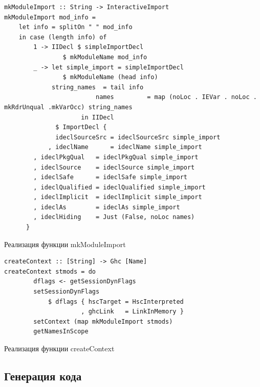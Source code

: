 		\begin{ListingEnv}[h]
		\begin{lstlisting}
mkModuleImport :: String -> InteractiveImport
mkModuleImport mod_info = 
	let info = splitOn " " mod_info
 	in case (length info) of
		1 -> IIDecl $ simpleImportDecl 
			    $ mkModuleName mod_info
		_ -> let simple_import = simpleImportDecl 
			    $ mkModuleName (head info)
			 string_names  = tail info
                         names         = map (noLoc . IEVar . noLoc . mkRdrUnqual .mkVarOcc) string_names
                     in IIDecl 
              $ ImportDecl { 
              ideclSourceSrc = ideclSourceSrc simple_import
            , ideclName      = ideclName simple_import
	    , ideclPkgQual   = ideclPkgQual simple_import
	    , ideclSource    = ideclSource simple_import
	    , ideclSafe      = ideclSafe simple_import
	    , ideclQualified = ideclQualified simple_import
	    , ideclImplicit  = ideclImplicit simple_import
	    , ideclAs        = ideclAs simple_import
	    , ideclHiding    = Just (False, noLoc names) 
	  }
		\end{lstlisting}
		\caption{Реализация функции mkModuleImport} \label{mkmod}
		\end{ListingEnv}
	
		\begin{ListingEnv}[h]
		\begin{lstlisting}
createContext :: [String] -> Ghc [Name]
createContext stmods = do
		dflags <- getSessionDynFlags
		setSessionDynFlags 
			$ dflags { hscTarget = HscInterpreted
			         , ghcLink   = LinkInMemory }
		setContext (map mkModuleImport stmods)
		getNamesInScope
		\end{lstlisting}
		\caption{Реализация функции createContext} \label{crcont}
		\end{ListingEnv}
		
	\subsection{Генерация кода}
